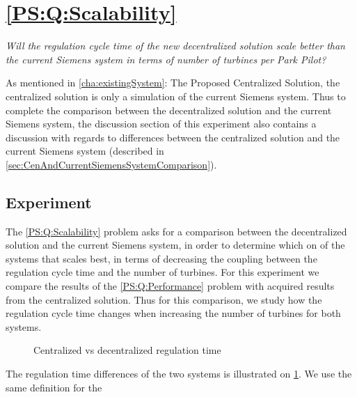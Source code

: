 \section{\ref{PS:Q:Scalability}}

\textit{Will the regulation cycle time of the new decentralized solution scale better than the current Siemens system in terms of number of turbines per Park Pilot?}\newline\newline

\noindent As mentioned in \cref{cha:existingSystem}: The Proposed Centralized Solution, the centralized solution is only a simulation of the current Siemens system. Thus to complete the comparison between the decentralized solution and the current Siemens system, the discussion section of this experiment also contains a discussion with regards to differences between the centralized solution and the current Siemens system (described in \cref{sec:CenAndCurrentSiemensSystemComparison}).

\subsection{Experiment}
\label{subsec:Exper:Scale}

The \ref{PS:Q:Scalability} problem asks for a comparison between the decentralized solution and the current Siemens system, in order to determine which on of the systems that scales best, in terms of decreasing the coupling between the regulation cycle time and the number of turbines. For this experiment we compare the results of the \ref{PS:Q:Performance} problem with acquired results from the centralized solution. Thus for this comparison, we study how the regulation cycle time changes when increasing the number of turbines for both systems.


\begin{figure}[b]
	\centering
	{}
	\newline
	
	\newline
	
	{}
	
	\caption{Centralized vs decentralized regulation time}
	\label{fig:timingCentralVSDecentral}
\end{figure}

The regulation time differences of the two systems is illustrated on \cref{fig:timingCentralVSDecentral}. We use the same definition for the 

